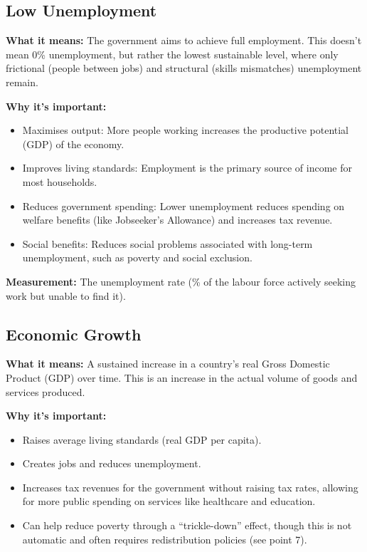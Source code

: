 \documentclass[11pt, a4paper, twoside]{book}
\begin{document}
\subsection{Low Unemployment}

\textbf{What it means:} The government aims to achieve full employment. This doesn't mean 0\% unemployment, but rather the lowest sustainable level, where only frictional (people between jobs) and structural (skills mismatches) unemployment remain.

\textbf{Why it's important:}
\begin{itemize}
  \item Maximises output: More people working increases the productive potential (GDP) of the economy.
  \item Improves living standards: Employment is the primary source of income for most households.
  \item Reduces government spending: Lower unemployment reduces spending on welfare benefits (like Jobseeker's Allowance) and increases tax revenue.
  \item Social benefits: Reduces social problems associated with long-term unemployment, such as poverty and social exclusion.
\end{itemize}

\textbf{Measurement:} The unemployment rate (\% of the labour force actively seeking work but unable to find it).

\subsection{Economic Growth}

\textbf{What it means:} A sustained increase in a country's real Gross Domestic Product (GDP) over time. This is an increase in the actual volume of goods and services produced.

\textbf{Why it's important:}
\begin{itemize}
  \item Raises average living standards (real GDP per capita).
  \item Creates jobs and reduces unemployment.
  \item Increases tax revenues for the government without raising tax rates, allowing for more public spending on services like healthcare and education.
  \item Can help reduce poverty through a ``trickle-down'' effect, though this is not automatic and often requires redistribution policies (see point 7).
\end{itemize}
\end{document}
